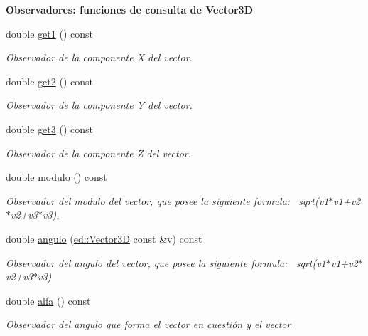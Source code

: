 \begin{Indent}\textbf{ Observadores\+: funciones de consulta de Vector3D}\par
\begin{DoxyCompactItemize}
\item 
double \mbox{\hyperlink{classed_1_1Vector3D_ac96497e7c082fde19b4998408e4ec36b}{get1}} () const
\begin{DoxyCompactList}\small\item\em Observador de la componente X del vector. \end{DoxyCompactList}\item 
double \mbox{\hyperlink{classed_1_1Vector3D_acb66f2ac0cb4f24592698fb317458e35}{get2}} () const
\begin{DoxyCompactList}\small\item\em Observador de la componente Y del vector. \end{DoxyCompactList}\item 
double \mbox{\hyperlink{classed_1_1Vector3D_a50c08e3089bc1b0cd5de77d8f0086cc0}{get3}} () const
\begin{DoxyCompactList}\small\item\em Observador de la componente Z del vector. \end{DoxyCompactList}\item 
double \mbox{\hyperlink{classed_1_1Vector3D_a9db1b9e9d7634efeb88f60130283bc9a}{modulo}} () const
\begin{DoxyCompactList}\small\item\em Observador del modulo del vector, que posee la siguiente formula\+:~\newline
 sqrt(v1$\ast$v1+v2$\ast$v2+v3$\ast$v3). \end{DoxyCompactList}\item 
double \mbox{\hyperlink{classed_1_1Vector3D_a0b41efa0f1d21a4fa730ff522ac3b5c7}{angulo}} (\mbox{\hyperlink{classed_1_1Vector3D}{ed\+::\+Vector3D}} const \&v) const
\begin{DoxyCompactList}\small\item\em Observador del angulo del vector, que posee la siguiente formula\+:~\newline
 sqrt(v1$\ast$v1+v2$\ast$v2+v3$\ast$v3) \end{DoxyCompactList}\item 
double \mbox{\hyperlink{classed_1_1Vector3D_af3b622283c86e66467fd6fb766990d3b}{alfa}} () const
\begin{DoxyCompactList}\small\item\em Observador del angulo que forma el vector en cuestión y el vector~\newline

\end{DoxyCompactList}
\end{DoxyCompactItemize}
\end{Indent}
